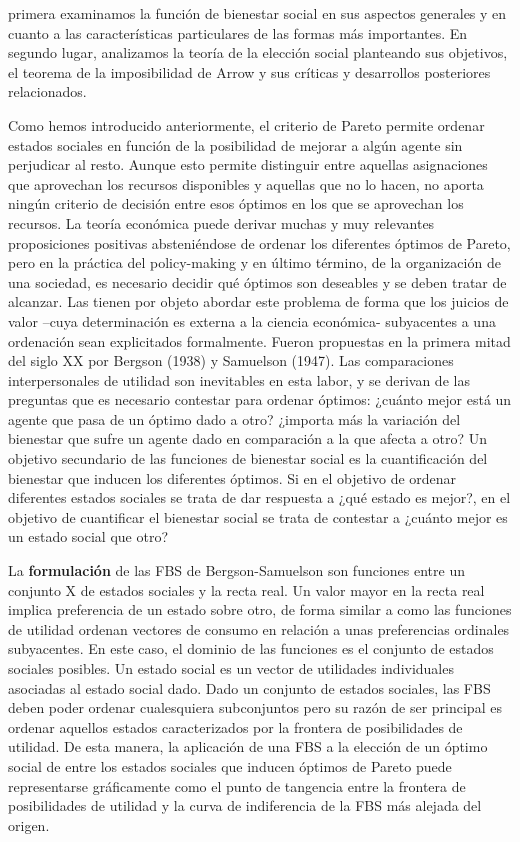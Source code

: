 \documentclass{nuevotema}
\begin{document}
primera examinamos la función de bienestar social en sus aspectos generales y en cuanto a las características particulares de las formas más importantes. En segundo lugar, analizamos la teoría de la elección social planteando sus objetivos, el teorema de la imposibilidad de Arrow y sus críticas y desarrollos posteriores relacionados.

Como hemos introducido anteriormente, el criterio de Pareto permite ordenar estados sociales en función de la posibilidad de mejorar a algún agente sin perjudicar al resto. Aunque esto permite distinguir entre aquellas asignaciones que aprovechan los recursos disponibles y aquellas que no lo hacen, no aporta ningún criterio de decisión entre esos óptimos en los que se aprovechan los recursos. La teoría económica puede derivar muchas y muy relevantes proposiciones positivas absteniéndose de ordenar los diferentes óptimos de Pareto, pero en la práctica del policy-making y en último término, de la organización de una sociedad, es necesario decidir qué óptimos son deseables y se deben tratar de alcanzar. Las  tienen por objeto abordar este problema de forma que los juicios de valor --cuya determinación es externa a la ciencia económica- subyacentes a una ordenación sean explicitados formalmente. Fueron propuestas en la primera mitad del siglo XX por Bergson (1938) y Samuelson (1947). Las comparaciones interpersonales de utilidad son inevitables en esta labor, y se derivan de las preguntas que es necesario contestar para ordenar óptimos: ¿cuánto mejor está un agente que pasa de un óptimo dado a otro? ¿importa más la variación del bienestar que sufre un agente dado en comparación a la que afecta a otro? Un objetivo secundario de las funciones de bienestar social es la cuantificación del bienestar que inducen los diferentes óptimos. Si en el objetivo de ordenar diferentes estados sociales se trata de dar respuesta a ¿qué estado es mejor?, en el objetivo de cuantificar el bienestar social se trata de contestar a ¿cuánto mejor es un estado social que otro?

La \textbf{formulación} de las FBS de Bergson-Samuelson son funciones entre un conjunto X de estados sociales y la recta real. Un valor mayor en la recta real implica preferencia de un estado sobre otro, de forma similar a como las funciones de utilidad ordenan vectores de consumo en relación a unas preferencias ordinales subyacentes. En este caso, el dominio de las funciones es el conjunto de estados sociales posibles. Un estado social es un vector de utilidades individuales asociadas al estado social dado. Dado un conjunto de estados sociales, las FBS deben poder ordenar cualesquiera subconjuntos pero su razón de ser principal es ordenar aquellos estados caracterizados por la frontera de posibilidades de utilidad. De esta manera, la aplicación de una FBS a la elección de un óptimo social de entre los estados sociales que inducen óptimos de Pareto puede representarse gráficamente como el punto de tangencia entre la frontera de posibilidades de utilidad y la curva de indiferencia de la FBS más alejada del origen. 
\end{document}

